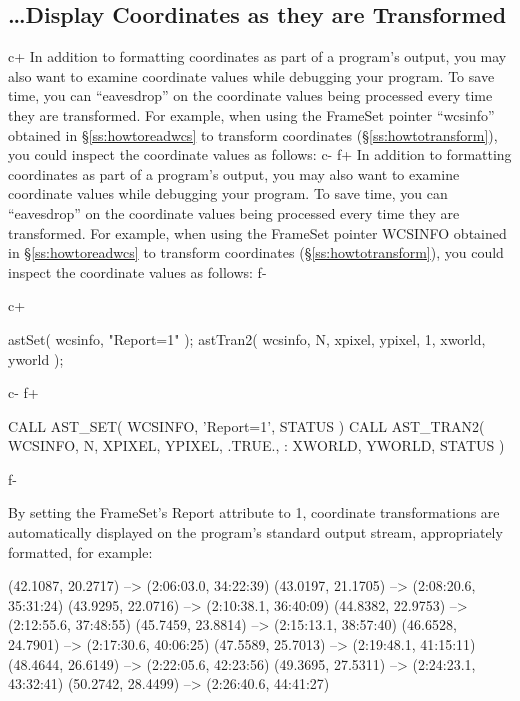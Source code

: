 \documentclass[twoside,11pt]{starlink}
\providecommand{\secref}[1]{\S\ref{#1}}
\begin{document}
\subsection{\ldots Display Coordinates as they are Transformed}

c+
In addition to formatting coordinates as part of a program's output,
you may also want to examine coordinate values while debugging your
program. To save time, you can ``eavesdrop'' on the coordinate values
being processed every time they are transformed. For example, when
using the FrameSet pointer ``wcsinfo'' obtained in
\secref{ss:howtoreadwcs} to transform coordinates
(\secref{ss:howtotransform}), you could inspect the coordinate values
as follows:
c-
f+
In addition to formatting coordinates as part of a program's output,
you may also want to examine coordinate values while debugging your
program. To save time, you can ``eavesdrop'' on the coordinate values
being processed every time they are transformed. For example, when
using the FrameSet pointer WCSINFO obtained in
\secref{ss:howtoreadwcs} to transform coordinates
(\secref{ss:howtotransform}), you could inspect the coordinate values
as follows:
f-

c+
\begin{small}
\begin{terminalv}
astSet( wcsinfo, "Report=1" );
astTran2( wcsinfo, N, xpixel, ypixel, 1, xworld, yworld );
\end{terminalv}
\end{small}
c-
f+
\begin{small}
\begin{terminalv}
      CALL AST_SET( WCSINFO, 'Report=1', STATUS )
      CALL AST_TRAN2( WCSINFO, N, XPIXEL, YPIXEL, .TRUE.,
     :                            XWORLD, YWORLD, STATUS )
\end{terminalv}
\end{small}
f-

By setting the FrameSet's Report attribute to 1, coordinate
transformations are automatically displayed on the program's standard
output stream, appropriately formatted, for example:

\begin{terminalv}
(42.1087, 20.2717) --> (2:06:03.0, 34:22:39)
(43.0197, 21.1705) --> (2:08:20.6, 35:31:24)
(43.9295, 22.0716) --> (2:10:38.1, 36:40:09)
(44.8382, 22.9753) --> (2:12:55.6, 37:48:55)
(45.7459, 23.8814) --> (2:15:13.1, 38:57:40)
(46.6528, 24.7901) --> (2:17:30.6, 40:06:25)
(47.5589, 25.7013) --> (2:19:48.1, 41:15:11)
(48.4644, 26.6149) --> (2:22:05.6, 42:23:56)
(49.3695, 27.5311) --> (2:24:23.1, 43:32:41)
(50.2742, 28.4499) --> (2:26:40.6, 44:41:27)
\end{terminalv}
\end{document}
